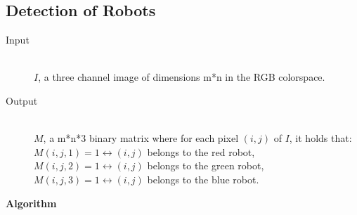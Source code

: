\documentclass[10pt,a4paper,twocolumn]{article}
\begin{document}
\subsection{Detection of Robots}
\begin{description}
\item[Input] \hfill \\
    $I$, a three channel image of dimensions m*n in the RGB colorspace.
\item[Output] \hfill \\
    $M$, a m*n*3 binary matrix where for each pixel $(i,j)$ of $I$, it holds 
    that: \\
    $M(i,j,1) = 1 \leftrightarrow (i,j)$ belongs to the red robot, \\
    $M(i,j,2) = 1 \leftrightarrow (i,j)$ belongs to the green robot, \\
    $M(i,j,3) = 1 \leftrightarrow (i,j)$ belongs to the blue robot.
\end{description}
\textbf{Algorithm}
\end{document}
